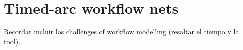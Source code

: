 \chapter{Timed-arc workflow nets}\label{chapter:c5}

Recordar incluir los challenges of workflow modelling (resaltar el tiempo y la tool).
